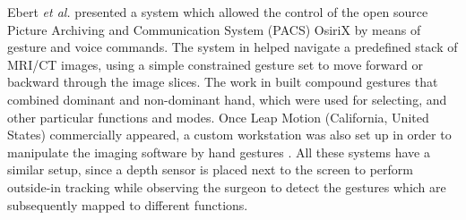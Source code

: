 Ebert \textit{et al.} \cite{Ebert2013} presented a system which allowed the control of the open source Picture Archiving and Communication System (PACS) OsiriX by means of gesture and voice commands.   
The system in \cite{Strickland2013} helped navigate a predefined stack of MRI/CT images, using a simple constrained gesture set to move forward or backward through the image slices. 
The work in \cite{Tan2013} built compound gestures that combined dominant and non-dominant hand, which were used for selecting, and other particular functions and modes. 
Once Leap Motion {(California, United States)} commercially appeared, a custom workstation was also set up in order to manipulate the imaging software by hand gestures \cite{Rosa2014}. 
All these systems have a similar setup, since a depth sensor is placed next to the screen to perform outside-in tracking while observing the surgeon to detect the gestures which are subsequently mapped to different functions. 

